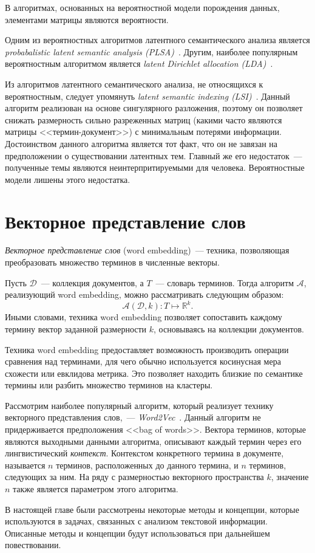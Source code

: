 В алгоритмах, основанных на вероятностной модели порождения
данных, элементами матрицы являются вероятности.

Одним из вероятностных алгоритмов латентного семантического анализа
является \textit{probabalistic latent semantic analysis 
(PLSA)}~\cite{chemudugunta2007modeling}. Другим, наиболее
популярным вероятностным алгоритмом является \textit{latent
Dirichlet allocation (LDA)}~\cite{blei2003latent}.

Из алгоритмов латентного семантического анализа, не относящихся
к вероятностным, следует упомянуть 
\textit{latent semantic indexing (LSI)}~\cite{deerwester1990indexing}.
Данный алгоритм реализован на основе сингулярного разложения,
поэтому он позволяет снижать размерность сильно разреженных
матриц (какими часто являются матрицы <<термин-документ>>) с
минимальным потерями информации. Достоинством данного алгоритма
является тот факт, что он не завязан на предположении о
существовании латентных тем. Главный же его недостаток~--- 
полученные темы являются неинтерпритируемыми для человека.
Вероятностные модели лишены этого недостатка.

\section{Векторное представление слов}
\label{sec:word_embedding}
\textit{Векторное представление слов} (word embedding)~---
техника, позволяющая преобразовать множество терминов в
численные векторы.

Пусть $\mathcal{D}$~--- коллекция документов, а
$T$~--- словарь терминов. Тогда алгоритм $\mathcal{A}$,
реализующий word embedding, можно рассматривать следующим образом:
\[
    \mathcal{A}(\mathcal{D}, k) \colon T \mapsto \mathbb{R}^k.
\]
Иными словами, техника word embedding позволяет сопоставить
каждому термину вектор заданной размерности $k$, основываясь
на коллекции документов.

Техника word embedding предоставляет возможность производить
операции сравнения над терминами, для чего обычно используется
косинусная мера схожести или евклидова метрика. Это позволяет
находить близкие по семантике термины или разбить множество
терминов на кластеры.

Рассмотрим наиболее популярный алгоритм, который реализует
технику векторного представления слов,~--- 
\textit{Word2Vec}~\cite{goldberg2014word2vec}. Данный
алгоритм не придерживается предположения <<bag of words>>.
Вектора терминов, которые являются выходными данными алгоритма,
описывают каждый термин через его лингвистический \textit{контекст}.
Контекстом конкретного термина в документе, называется $n$ терминов,
расположенных до данного термина, и $n$ терминов, следующих за ним.
На ряду с размерностью векторного пространства $k$, значение $n$
также является параметром этого алгоритма.

\chapterconclusion

В настоящей главе были рассмотрены некоторые методы и концепции,
которые используются в задачах, связанных с анализом текстовой
информации. Описанные методы и концепции будут использоваться
при дальнейшем повествовании.
